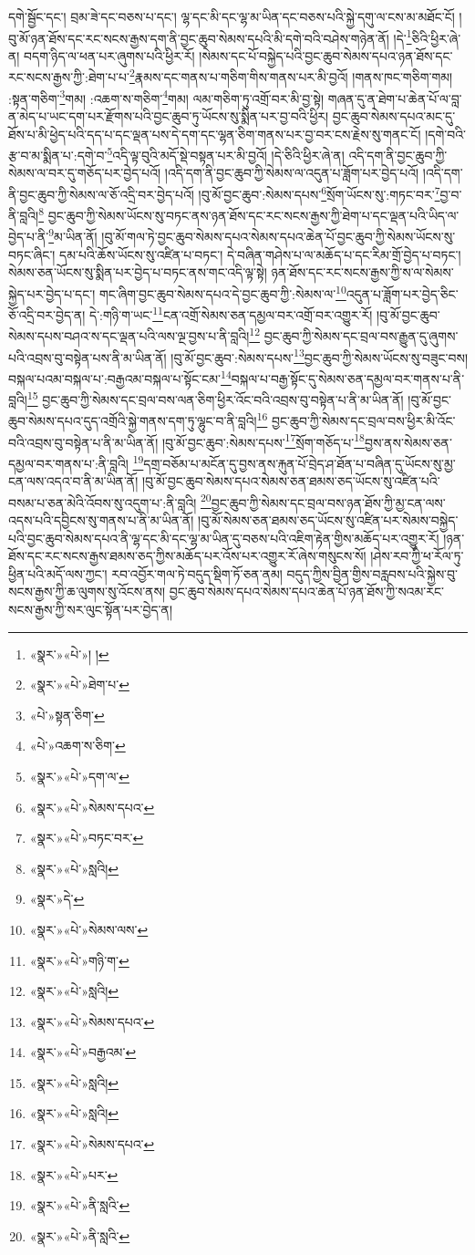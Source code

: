 དགེ་སྦྱོང་དང་། བྲམ་ཟེ་དང་བཅས་པ་དང་། ལྷ་དང་མི་དང་ལྷ་མ་ཡིན་དང་བཅས་པའི་སྐྱེ་དགུ་ལ་ངས་མ་མཐོང་ངོ། །བུ་མོ་ཉན་ཐོས་དང་རང་སངས་རྒྱས་དག་ནི་བྱང་ཆུབ་སེམས་དཔའི་མི་དགེ་བའི་བཤེས་གཉེན་ནོ། །དེ་\footnote{«སྣར་»«པེ་»། །}ཅིའི་ཕྱིར་ཞེ་ན། བདག་ཉིད་ལ་ཕན་པར་ཞུགས་པའི་ཕྱིར་རོ། །སེམས་དང་པོ་བསྐྱེད་པའི་བྱང་ཆུབ་སེམས་དཔའ་ཉན་ཐོས་དང་རང་སངས་རྒྱས་ཀྱི་:ཐེག་པ་པ་\footnote{«སྣར་»«པེ་»ཐེག་པ་}རྣམས་དང་གནས་པ་གཅིག་གིས་གནས་པར་མི་བྱའོ། །གནས་ཁང་གཅིག་གམ། :སྟན་གཅིག་\footnote{«པེ་»སྟན་ཅིག་}གམ། :འཆག་ས་གཅིག་\footnote{«པེ་»འཆག་ས་ཅིག་}གམ། ལམ་གཅིག་ཏུ་འགྲོ་བར་མི་བྱ་སྟེ། གཞན་དུ་ན་ཐེག་པ་ཆེན་པོ་ལ་བླ་ན་མེད་པ་ཡང་དག་པར་རྫོགས་པའི་བྱང་ཆུབ་ཏུ་ཡོངས་སུ་སྨིན་པར་བྱ་བའི་ཕྱིར། བྱང་ཆུབ་སེམས་དཔའ་མང་དུ་ཐོས་པ་མི་ཕྱེད་པའི་དད་པ་དང་ལྡན་པས་དེ་དག་དང་ལྷན་ཅིག་གནས་པར་བྱ་བར་ངས་རྗེས་སུ་གནང་ངོ། །དགེ་བའི་རྩ་བ་མ་སྨིན་པ་:དགེ་བ་\footnote{«སྣར་»«པེ་»དག་ལ་}འདི་ལྟ་བུའི་མདོ་སྡེ་བསྟན་པར་མི་བྱའོ། །དེ་ཅིའི་ཕྱིར་ཞེ་ན། འདི་དག་ནི་བྱང་ཆུབ་ཀྱི་སེམས་ལ་བར་དུ་གཅོད་པར་བྱེད་པའོ། །འདི་དག་ནི་བྱང་ཆུབ་ཀྱི་སེམས་ལ་འདུན་པ་ཟློག་པར་བྱེད་པའོ། །འདི་དག་ནི་བྱང་ཆུབ་ཀྱི་སེམས་ལ་ཅོ་འདྲི་བར་བྱེད་པའོ། །བུ་མོ་བྱང་ཆུབ་:སེམས་དཔས་\footnote{«སྣར་»«པེ་»སེམས་དཔའ་}སྲོག་ཡོངས་སུ་:གཏང་བར་\footnote{«སྣར་»«པེ་»བཏང་བར་}བྱ་བ་ནི་བླའི།\footnote{«སྣར་»«པེ་»སླའི།} བྱང་ཆུབ་ཀྱི་སེམས་ཡོངས་སུ་བཏང་ནས་ཉན་ཐོས་དང་རང་སངས་རྒྱས་ཀྱི་ཐེག་པ་དང་ལྡན་པའི་ཡིད་ལ་བྱེད་པ་ནི་\footnote{«སྣར་»དེ་}མ་ཡིན་ནོ། །བུ་མོ་གལ་ཏེ་བྱང་ཆུབ་སེམས་དཔའ་སེམས་དཔའ་ཆེན་པོ་བྱང་ཆུབ་ཀྱི་སེམས་ཡོངས་སུ་བཏང་ཞིང་། དམ་པའི་ཆོས་ཡོངས་སུ་འཛིན་པ་བཏང་། དེ་བཞིན་གཤེས་པ་ལ་མཆོད་པ་དང་རིམ་གྲོ་བྱེད་པ་བཏང་། སེམས་ཅན་ཡོངས་སུ་སྨིན་པར་བྱེད་པ་བཏང་ནས་གང་འདི་ལྟ་སྟེ། ཉན་ཐོས་དང་རང་སངས་རྒྱས་ཀྱི་ས་ལ་སེམས་སྐྱེད་པར་བྱེད་པ་དང་། གང་ཞིག་བྱང་ཆུབ་སེམས་དཔའ་དེ་བྱང་ཆུབ་ཀྱི་:སེམས་ལ་\footnote{«སྣར་»«པེ་»སེམས་ལས་}འདུན་པ་ཟློག་པར་བྱེད་ཅིང་ཅོ་འདྲི་བར་བྱེད་ན། དེ་:གཉི་ག་ཡང་\footnote{«སྣར་»«པེ་»གཉི་ག་}ངན་འགྲོ་སེམས་ཅན་དམྱལ་བར་འགྲོ་བར་འགྱུར་རོ། །བུ་མོ་བྱང་ཆུབ་སེམས་དཔས་བཤའ་ས་དང་ལྡན་པའི་ལས་ལྔ་བྱས་པ་ནི་བླའི།\footnote{«སྣར་»«པེ་»སླའི།} བྱང་ཆུབ་ཀྱི་སེམས་དང་བྲལ་བས་རྒྱུན་དུ་ཞུགས་པའི་འབྲས་བུ་བསྟེན་པས་ནི་མ་ཡིན་ནོ། །བུ་མོ་བྱང་ཆུབ་:སེམས་དཔས་\footnote{«སྣར་»«པེ་»སེམས་དཔའ་}བྱང་ཆུབ་ཀྱི་སེམས་ཡོངས་སུ་བཟུང་བས། བསྐལ་པའམ་བསྐལ་པ་:བརྒྱའམ་བསྐལ་པ་སྟོང་ངམ་\footnote{«སྣར་»«པེ་»བརྒྱའམ་}བསྐལ་པ་བརྒྱ་སྟོང་དུ་སེམས་ཅན་དམྱལ་བར་གནས་པ་ནི་བླའི།\footnote{«སྣར་»«པེ་»སླའི།} བྱང་ཆུབ་ཀྱི་སེམས་དང་བྲལ་བས་ལན་ཅིག་ཕྱིར་འོང་བའི་འབྲས་བུ་བསྟེན་པ་ནི་མ་ཡིན་ནོ། །བུ་མོ་བྱང་ཆུབ་སེམས་དཔའ་དུད་འགྲོའི་སྐྱེ་གནས་དག་ཏུ་ལྷུང་བ་ནི་བླའི།\footnote{«སྣར་»«པེ་»སླའི།} བྱང་ཆུབ་ཀྱི་སེམས་དང་བྲལ་བས་ཕྱིར་མི་འོང་བའི་འབྲས་བུ་བསྟེན་པ་ནི་མ་ཡིན་ནོ། །བུ་མོ་བྱང་ཆུབ་:སེམས་དཔས་\footnote{«སྣར་»«པེ་»སེམས་དཔའ་}སྲོག་གཅོད་པ་\footnote{«སྣར་»«པེ་»པར་}བྱས་ནས་སེམས་ཅན་དམྱལ་བར་གནས་པ་:ནི་བླའི། \footnote{«སྣར་»«པེ་»ནི་སླའི་}དགྲ་བཅོམ་པ་མངོན་དུ་བྱས་ནས་རྐུན་པོ་བྲེད་ཤ་ཐོན་པ་བཞིན་དུ་ཡོངས་སུ་མྱ་ངན་ལས་འདའ་བ་ནི་མ་ཡིན་ནོ། །བུ་མོ་བྱང་ཆུབ་སེམས་དཔའ་སེམས་ཅན་ཐམས་ཅད་ཡོངས་སུ་འཛིན་པའི་བསམ་པ་ཅན་མེའི་འོབས་སུ་འདུག་པ་:ནི་བླའི། \footnote{«སྣར་»«པེ་»ནི་སླའི་}བྱང་ཆུབ་ཀྱི་སེམས་དང་བྲལ་བས་ཉན་ཐོས་ཀྱི་མྱ་ངན་ལས་འདས་པའི་དབྱིངས་སུ་གནས་པ་ནི་མ་ཡིན་ནོ། །བུ་མོ་སེམས་ཅན་ཐམས་ཅད་ཡོངས་སུ་འཛིན་པར་སེམས་བསྐྱེད་པའི་བྱང་ཆུབ་སེམས་དཔའ་ནི་ལྷ་དང་མི་དང་ལྷ་མ་ཡིན་དུ་བཅས་པའི་འཇིག་རྟེན་གྱིས་མཆོད་པར་འགྱུར་རོ། །ཉན་ཐོས་དང་རང་སངས་རྒྱས་ཐམས་ཅད་ཀྱིས་མཆོད་པར་འོས་པར་འགྱུར་རོ་ཞེས་གསུངས་སོ། །ཤེས་རབ་ཀྱི་ཕ་རོལ་ཏུ་ཕྱིན་པའི་མདོ་ལས་ཀྱང་། རབ་འབྱོར་གལ་ཏེ་བདུད་སྡིག་ཏོ་ཅན་ནམ། བདུད་ཀྱིས་བྱིན་གྱིས་བརླབས་པའི་སྐྱེས་བུ་སངས་རྒྱས་ཀྱི་ཆ་ལུགས་སུ་འོངས་ནས། བྱང་ཆུབ་སེམས་དཔའ་སེམས་དཔའ་ཆེན་པོ་ཉན་ཐོས་ཀྱི་སའམ་རང་སངས་རྒྱས་ཀྱི་སར་ལུང་སྟོན་པར་བྱེད་ན། 